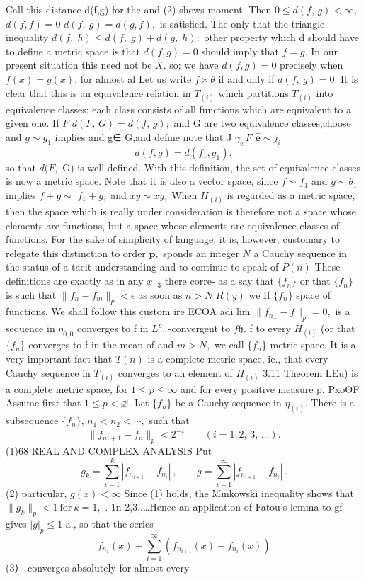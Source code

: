 Call this distance d(f,g) for the and (2) shows moment. Then $0\leq d(f,\,g)<\infty,$ $d(f,f)=0$ $d(f,\ g)=d(g,f),$ is satisfied. The only that the triangle inequality $d(f,\;h)\leq d(f,\;g)+d(g,\;h):$ other property which d should have to define a metric space is that $d(f,g)=0$ should imply that $f=g.$ In our present situation this need not be $\scriptstyle X.$ so; we have $d(f,g)=0$ precisely when $f(x)=g(x).$ for almost al Let us write $\scriptstyle{f\times\theta}$ if and only if $d(f,~g)=0.$ It is clear that this is an equivalence relation in $\scriptstyle T_{(i)}$ which partitions $\scriptstyle T_{(i)}$ into equivalence classes; each class consists of all functions which are equivalent to a given one. If ${\mathbf{}}F$ $d(F,\,G)=d(f,\,g);$ and G are two equivalence classes,choose and $g\sim g_{1}$ implies and g∈ G,and define note that J $\gamma_{\mathrm{e}}\,F$ $\textstyle{\mathbf{\hat{e}}}\sim j_{i}$ $$ d(f,g)=d(f_{1},g_{1}), $$ so that $d(F,$ G) is well defined. With this definition, the set of equivalence classes is now a metric space. Note that it is also a vector space, since $f\sim f_{1}$ and $\scriptstyle g\sim\theta_{1}$ implies $f+g\sim$ $f_{1}+g_{1}$ and $x y\sim x y_{1}$ When $\scriptstyle{H_{(i)}}$ is regarded as a metric space, then the space which is really under consideration is therefore not a space whose elements are functions, but a space whose elements are equivalence classes of functions. For the sake of simplicity of language, it is, however, customary to relegate this distinction to order ${\boldsymbol{p}},$ sponds an integer ${\mathbf{}}N$ a Cauchy sequence in the status of a tacit understanding and to continue to speak of $P(n)$ These definitions are exactly as in any $\scriptstyle x\;{\ _{3}}$ there corre- as a say that $\{f_{n}\}$ or that $\{f_{n}\}$ is such that $\|f_{n}-f_{m}\|_{p}<\epsilon$ as soon as $n>N$ $\scriptstyle R(y)$ we If $\{f_{n}\}$ space of functions. We shall follow this custom ire ECOA adi lim $\|f_{n_{-}}-f\|_{p}=0,$ is a sequence in $\scriptstyle\eta_{0,0}$ converges to f in $L^{p}.$ -convergent to $f{\mathfrak{h}}.$ f to every $\scriptstyle{H_{(i)}}$ (or that $\{f_{n}\}$ converges to f in the mean of and $m>N,$ we call $\{f_{n}\}$ metric space. It is a very important fact that $\scriptstyle T(n)$ is a complete metric space, ie., that every Cauchy sequence in $\scriptstyle T_{(i)}$ converges to an element of $\scriptstyle{H_{(i)}}$ 3.11 Theorem LEu) is a complete metric space, for $1\leq p\leq\infty$ and for every positive measure p. PxoOF Assume first that $1\leq p<\varnothing.$ Let $\{f_{n}\}$ be a Cauchy sequence in $\scriptstyle\eta_{(i)}.$ There is a subsequence $\{f_{n}\},\,n_{1}<n_{2}<\cdots,$ such that $$ \|f_{n i+1}-f_{n}\parallel_{p}<2^{-i}\qquad(i=1,2,\,3,\,\ldots). $$ (1)$68$ REAL AND COMPLEX ANALYSIS Put $$ g_{k}=\sum_{i=1}^{k}|f_{n_{i+1}}-f_{n_{i}}|\,,\qquad g=\sum_{i=1}^{\infty}|f_{n_{i+1}}-f_{n_{i}}|\,. $$ (2) particular, $g(x)<\infty$ Since (1) holds, the Minkowski inequality shows that $\|g_{k}\|_{p}<1{\mathrm{~for~}}k=1,$ . 1n 2,3,.…Hence an application of Fatou's lemma to {gf} gives $|g|_{p}\leq1$ a., so that the series $$ f_{n_{1}}(x)+\sum_{i=1}^{\infty}(f_{n_{i+1}}(x)-f_{n_{i}}(x)) $$ (3） converges absolutely for almost every 